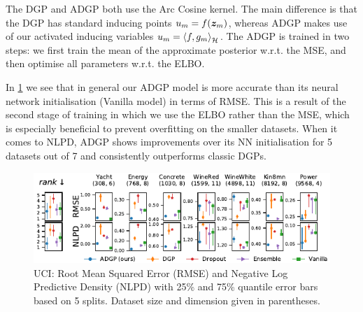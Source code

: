 The DGP and ADGP both use the Arc Cosine kernel. The main difference is that the DGP has standard inducing points $u_m = f(\bm{z}_m)$, whereas ADGP makes use of our activated inducing variables $u_m = \langle f, g_m \rangle_{{\mathcal{H}}}^{}$. The ADGP is trained in two steps: we first train the mean of the approximate posterior w.r.t. the MSE, and then optimise all parameters w.r.t. the ELBO.

In \cref{fig:uci} we see that in general our ADGP model is more accurate than its neural network initialisation (Vanilla model) in terms of RMSE. This is a result of the second stage of training in which we use the ELBO rather than the MSE, which is especially beneficial to prevent overfitting on the smaller datasets. When it comes to NLPD, ADGP shows improvements over its NN initialisation for 5 datasets out of 7 and consistently outperforms classic DGPs.

\begin{figure}
    \centering
    \includegraphics[width=\textwidth]{uci_small}
    \caption{UCI: Root Mean Squared Error (RMSE) and Negative Log Predictive Density (NLPD) with 25\% and 75\% quantile error bars based on 5 splits. Dataset size and dimension given in parentheses.}
    \label{fig:uci}
\end{figure}

